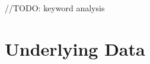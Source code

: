 \documentclass[10pt,a4paper,twocolumn]{scrartcl}
\begin{document}
//TODO: keyword analysis

\section{Underlying Data}
%
%
\end{document}
